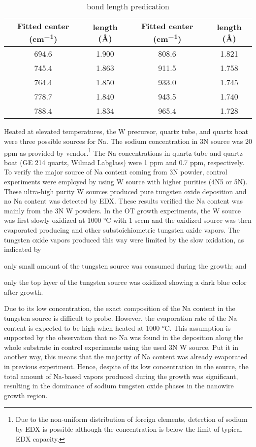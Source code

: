 \begin{table}[htb]
\centering
\caption{ bond length predication}\label{tab:nawobond}
\begin{tabular}{cccc}
\toprule
Fitted center (\si{cm^{-1}}) & length (\AA) & Fitted center (\si{cm^{-1}}) & length (\AA) \\
\midrule
694.6 & 1.900 &  808.6 &  1.821 \\
745.4 & 1.863 &  911.5 &  1.758 \\
764.4 & 1.850 &  933.0 &  1.745 \\
778.7 & 1.840 &   943.5 & 1.740 \\
788.4 & 1.834 &   965.4 & 1.728 \\
\bottomrule
\end{tabular}
\end{table}

Heated at elevated temperatures, the W precursor, quartz tube, and quartz boat were three possible sources for Na. The sodium concentration in 3N source was 20 ppm as provided by vendor.\footnote{Due to the non-uniform distribution of foreign elements, detection of sodium by EDX is possible although the concentration is below the limit of typical EDX capacity.} The Na concentrations in quartz tube and quartz boat (GE 214 quartz, Wilmad Labglass) were 1 ppm and 0.7 ppm, respectively. To verify the major source of Na content coming from 3N powder, control experiments were employed by using W source with higher purities (4N5 or 5N). These ultra-high purity W sources produced pure tungsten oxide deposition and no Na content was detected by EDX. These results verified the Na content was mainly from the 3N W powders. In the OT growth experiments, the W source was first slowly oxidized at 1000 \si{\degreeCelsius} with 1 sccm  and the oxidized source was then evaporated producing  and other substoichiometric tungsten oxide vapors. The tungsten oxide vapors produced this way were limited by the slow oxidation, as indicated by
\begin{enumerate*}[label=\itshape\alph*\upshape)]
\item only small amount of the tungsten source was consumed during the growth; and
\item only the top layer of the tungsten source was oxidized showing a dark blue color after growth.
\end{enumerate*} Due to its low concentration, the exact composition of the Na content in the tungsten source is difficult to probe. However, the evaporation rate of the Na content is expected to be high when heated at 1000 \si{\degreeCelsius}. This assumption is supported by the observation that no Na was found in the deposition along the whole substrate in control experiments using the used 3N W source. Put it in another way, this means that the majority of Na content was already evaporated in previous experiment. Hence, despite of its low concentration in the source, the total amount of Na-based vapors produced during the growth was significant, resulting in the dominance of sodium tungsten oxide phases in the nanowire growth region.

